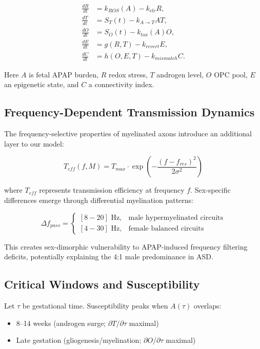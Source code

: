 \documentclass[12pt]{article}
\begin{document}
\begin{align}
\frac{dR}{dt} &= k_{ROS}(A) - k_{clr}R, \\
\frac{dT}{dt} &= S_T(t) - k_{A \rightarrow T}AT, \\
\frac{dO}{dt} &= S_O(t) - k_{tox}(A)O, \\
\frac{dE}{dt} &= g(R,T) - k_{revert}E, \\
\frac{dC}{dt} &= h(O,E,T) - k_{mismatch}C.
\end{align}

Here $A$ is fetal APAP burden, $R$ redox stress, $T$ androgen level, $O$ OPC pool, $E$ an epigenetic state, and $C$ a connectivity index.

\subsection{Frequency-Dependent Transmission Dynamics}
The frequency-selective properties of myelinated axons introduce an additional layer to our model:

\begin{equation}
T_{eff}(f,M) = T_{max} \cdot \exp\left(-\frac{(f-f_{res})^2}{2\sigma^2}\right)
\end{equation}

where $T_{eff}$ represents transmission efficiency at frequency $f$. Sex-specific differences emerge through differential myelination patterns:

\begin{equation}
\Delta f_{pass} = \begin{cases}
[8-20] \text{ Hz}, & \text{male hypermyelinated circuits} \\
[4-30] \text{ Hz}, & \text{female balanced circuits}
\end{cases}
\end{equation}

This creates sex-dimorphic vulnerability to APAP-induced frequency filtering deficits, potentially explaining the 4:1 male predominance in ASD.

\subsection{Critical Windows and Susceptibility}
Let $\tau$ be gestational time. Susceptibility peaks when $A(\tau)$ overlaps:
\begin{itemize}
\item 8--14 weeks (androgen surge; $\partial T/\partial \tau$ maximal)
\item Late gestation (gliogenesis/myelination; $\partial O/\partial \tau$ maximal)
\end{itemize}
\end{document}
